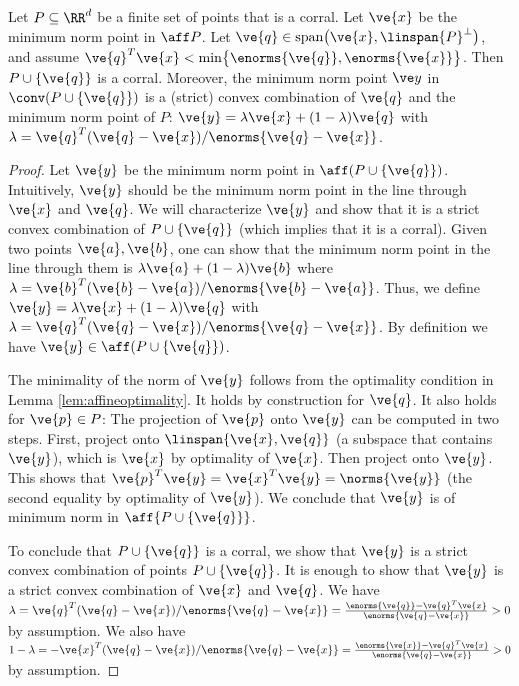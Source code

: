 \begin{lemma}\label{lem:corralpluspoint}
Let $P \subseteq \RR^d$ be a finite set of points that is a corral. Let $\ve{x}$ be the minimum norm point in $\aff P$.
Let $\ve{q} \in \operatorname{span} \bigl(\ve{x}, \linspan{P}^\perp\bigr)$, and assume $\ve{q}^T\ve{x} < \min \bigl\{\enorms{\ve{q}}, \enorms{\ve{x}} \bigr\}$. Then $P \cup \{\ve{q}\}$ is a corral. Moreover, the minimum norm point $\ve y$ in  $\conv (P \cup \{\ve{q}\})$ is a (strict) convex combination of $\ve{q}$ and the minimum norm point of $P$: $\ve{y} = \lambda \ve{x} + (1-\lambda)\ve{q}$ with $\lambda = \ve{q}^T (\ve{q}-\ve{x})/\enorms{\ve{q}-\ve{x}}$.
\end{lemma}
\begin{proof}
Let $\ve{y}$ be the minimum norm point in $\aff ({P \cup \{\ve{q}\}})$.
Intuitively, $\ve{y}$ should be the minimum norm point in the line through $\ve{x}$ and $\ve{q}$.
We will characterize $\ve{y}$ and show that it is a strict convex combination of $P \cup \{\ve{q}\}$ (which implies that it is a corral).
Given two points $\ve{a}, \ve{b}$, one can show that the minimum norm point in the line through them is $\lambda \ve{a} + (1-\lambda)\ve{b}$ where $\lambda = \ve{b}^T (\ve{b}-\ve{a})/\enorms{\ve{b}-\ve{a}}$.
Thus, we define $\ve{y} = \lambda \ve{x} + (1-\lambda)\ve{q}$ with $\lambda = \ve{q}^T (\ve{q}-\ve{x})/\enorms{\ve{q}-\ve{x}}$.
By definition we have $\ve{y} \in \aff(P \cup \{\ve{q}\})$.

The minimality of the norm of $\ve{y}$ follows from the optimality condition in Lemma \ref{lem:affineoptimality}. 
It holds by construction for $\ve{q}$. It also holds for $\ve{p} \in P$: 
The projection of $\ve{p}$ onto $\ve{y}$ can be computed in two steps. 
First, project onto $\linspan{\ve{x},\ve{q}}$ (a subspace that contains $\ve{y}$), which is $\ve{x}$ by optimality of $\ve{x}$. 
Then project onto $\ve{y}$. 
This shows that $\ve{p}^T \ve{y} = \ve{x}^T \ve{y} = \norms{\ve{y}}$ (the second equality by optimality of $\ve{y}$). 
We conclude that $\ve{y}$ is of minimum norm in $\aff{P \cup \{\ve{q}\}}$.

To conclude that $P \cup \{\ve{q}\}$ is a corral, we show that $\ve{y}$ is a strict convex combination of points $P \cup \{\ve{q}\}$.
It is enough to show that $\ve{y}$ is a strict convex combination of $\ve{x}$ and $\ve{q}$.
We have $\lambda = \ve{q}^T (\ve{q}-\ve{x})/\enorms{\ve{q}-\ve{x}} = \frac{\enorms{\ve{q}} - \ve{q}^T\ve{x}}{\enorms{\ve{q}-\ve{x}}} > 0$ by assumption.
We also have $1-\lambda = -\ve{x}^T (\ve{q}-\ve{x})/\enorms{\ve{q}-\ve{x}} = \frac{\enorms{\ve{x}} - \ve{q}^T\ve{x}}{\enorms{\ve{q}-\ve{x}}} > 0$ by assumption.
\end{proof}


